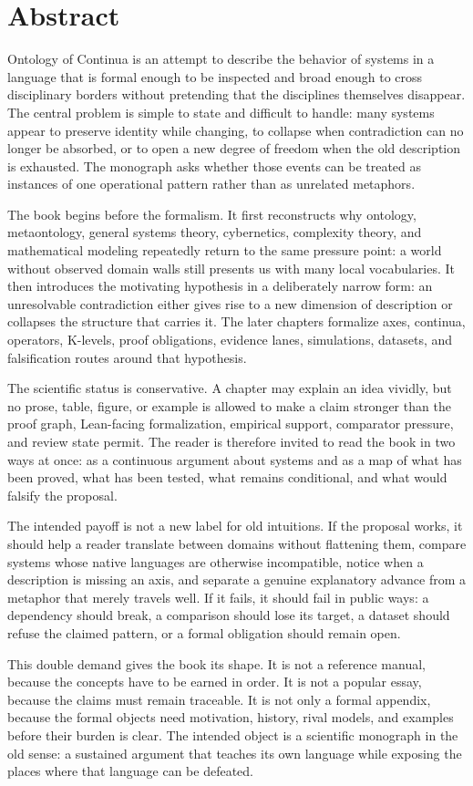 \documentclass[11pt,a4paper,openany]{book}
\begin{document}
\section*{Abstract}
Ontology of Continua is an attempt to describe the behavior of systems in a language that is formal enough to be inspected and broad enough to cross disciplinary borders without pretending that the disciplines themselves disappear. The central problem is simple to state and difficult to handle: many systems appear to preserve identity while changing, to collapse when contradiction can no longer be absorbed, or to open a new degree of freedom when the old description is exhausted. The monograph asks whether those events can be treated as instances of one operational pattern rather than as unrelated metaphors.\par
The book begins before the formalism. It first reconstructs why ontology, metaontology, general systems theory, cybernetics, complexity theory, and mathematical modeling repeatedly return to the same pressure point: a world without observed domain walls still presents us with many local vocabularies. It then introduces the motivating hypothesis in a deliberately narrow form: an unresolvable contradiction either gives rise to a new dimension of description or collapses the structure that carries it. The later chapters formalize axes, continua, operators, K-levels, proof obligations, evidence lanes, simulations, datasets, and falsification routes around that hypothesis.\par
The scientific status is conservative. A chapter may explain an idea vividly, but no prose, table, figure, or example is allowed to make a claim stronger than the proof graph, Lean-facing formalization, empirical support, comparator pressure, and review state permit. The reader is therefore invited to read the book in two ways at once: as a continuous argument about systems and as a map of what has been proved, what has been tested, what remains conditional, and what would falsify the proposal.\par
The intended payoff is not a new label for old intuitions. If the proposal works, it should help a reader translate between domains without flattening them, compare systems whose native languages are otherwise incompatible, notice when a description is missing an axis, and separate a genuine explanatory advance from a metaphor that merely travels well. If it fails, it should fail in public ways: a dependency should break, a comparison should lose its target, a dataset should refuse the claimed pattern, or a formal obligation should remain open.\par
This double demand gives the book its shape. It is not a reference manual, because the concepts have to be earned in order. It is not a popular essay, because the claims must remain traceable. It is not only a formal appendix, because the formal objects need motivation, history, rival models, and examples before their burden is clear. The intended object is a scientific monograph in the old sense: a sustained argument that teaches its own language while exposing the places where that language can be defeated.\par
\end{document}
